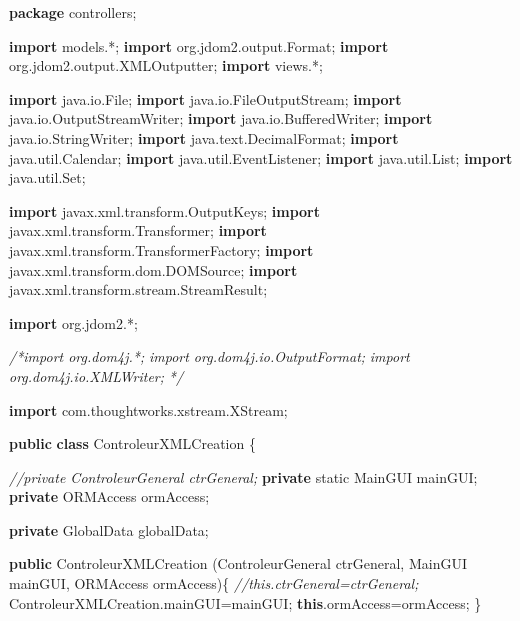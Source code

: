 \documentclass[]{article}
\newenvironment{Shaded}{}{}
\newcommand{\KeywordTok}[1]{\textcolor[rgb]{0.00,0.44,0.13}{\textbf{{#1}}}}
\newcommand{\DataTypeTok}[1]{\textcolor[rgb]{0.56,0.13,0.00}{{#1}}}
\newcommand{\ImportTok}[1]{{#1}}
\newcommand{\CommentTok}[1]{\textcolor[rgb]{0.38,0.63,0.69}{\textit{{#1}}}}
\newcommand{\FunctionTok}[1]{\textcolor[rgb]{0.02,0.16,0.49}{{#1}}}
\newcommand{\NormalTok}[1]{{#1}}
\begin{document}
\begin{Shaded}
\begin{Highlighting}[]
\KeywordTok{package}\ImportTok{ controllers;}

\KeywordTok{import}\ImportTok{ models.*;}
\KeywordTok{import}\ImportTok{ org.jdom2.output.Format;}
\KeywordTok{import}\ImportTok{ org.jdom2.output.XMLOutputter;}
\KeywordTok{import}\ImportTok{ views.*;}

\KeywordTok{import}\ImportTok{ java.io.File;}
\KeywordTok{import}\ImportTok{ java.io.FileOutputStream;}
\KeywordTok{import}\ImportTok{ java.io.OutputStreamWriter;}
\KeywordTok{import}\ImportTok{ java.io.BufferedWriter;}
\KeywordTok{import}\ImportTok{ java.io.StringWriter;}
\KeywordTok{import}\ImportTok{ java.text.DecimalFormat;}
\KeywordTok{import}\ImportTok{ java.util.Calendar;}
\KeywordTok{import}\ImportTok{ java.util.EventListener;}
\KeywordTok{import}\ImportTok{ java.util.List;}
\KeywordTok{import}\ImportTok{ java.util.Set;}

\KeywordTok{import}\ImportTok{ javax.xml.transform.OutputKeys;}
\KeywordTok{import}\ImportTok{ javax.xml.transform.Transformer;}
\KeywordTok{import}\ImportTok{ javax.xml.transform.TransformerFactory;}
\KeywordTok{import}\ImportTok{ javax.xml.transform.dom.DOMSource;}
\KeywordTok{import}\ImportTok{ javax.xml.transform.stream.StreamResult;}

\KeywordTok{import}\ImportTok{ org.jdom2.*;}

\CommentTok{/*import org.dom4j.*;}
\CommentTok{import org.dom4j.io.OutputFormat;}
\CommentTok{import org.dom4j.io.XMLWriter;}
\CommentTok{*/}

\KeywordTok{import}\ImportTok{ com.thoughtworks.xstream.XStream;}

\KeywordTok{public} \KeywordTok{class} \NormalTok{ControleurXMLCreation \{}

	\CommentTok{//private ControleurGeneral ctrGeneral;}
	\KeywordTok{private} \DataTypeTok{static} \NormalTok{MainGUI mainGUI;}
	\KeywordTok{private} \NormalTok{ORMAccess ormAccess;}

	\KeywordTok{private} \NormalTok{GlobalData globalData;}

	\KeywordTok{public} \FunctionTok{ControleurXMLCreation}
	  \NormalTok{(ControleurGeneral ctrGeneral, MainGUI mainGUI, ORMAccess ormAccess)\{}
		\CommentTok{//this.ctrGeneral=ctrGeneral;}
		\NormalTok{ControleurXMLCreation.}\FunctionTok{mainGUI}\NormalTok{=mainGUI;}
		\KeywordTok{this}\NormalTok{.}\FunctionTok{ormAccess}\NormalTok{=ormAccess;}
	\NormalTok{\}}


\end{Highlighting}
\end{Shaded}
\end{document}
